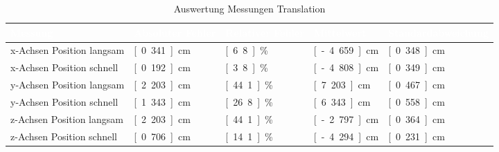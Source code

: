 \begin{table}[htbp]
     \centering
     \caption{Auswertung Messungen Translation}
     \label{tab:auswertung_tran}
     \begin{tabularx}{\textwidth}{|X|l|l|l|l|} 
		\hline
		\rowcolor{bfhblue}
		\textcolor{white}{Messung} & \textcolor{white}{Absoluter Fehler} & \textcolor{white}{Relativer Fehler} & \textcolor{white}{Mittelwert}  & \textcolor{white}{Standardabweichung}\\
		\hline
		x-Achsen Position langsam & \unit[0.341]{cm} & \unit[6.8]{\%} & \unit[-4.659]{cm} & \unit[0.348]{cm}\\
		\hline
		x-Achsen Position schnell & \unit[0.192]{cm} & \unit[3.8]{\%} & \unit[-4.808]{cm} & \unit[0.349]{cm} \\
		\hline
		y-Achsen Position langsam & \unit[2.203]{cm} & \unit[44.1]{\%} & \unit[7.203]{cm} & \unit[0.467]{cm}\\
		\hline
		y-Achsen Position schnell & \unit[1.343]{cm} & \unit[26.8]{\%} & \unit[6.343]{cm} & \unit[0.558]{cm} \\
		\hline
		z-Achsen Position langsam & \unit[2.203]{cm} & \unit[44.1]{\%} & \unit[-2.797]{cm} & \unit[0.364]{cm} \\
		\hline
		z-Achsen Position schnell & \unit[0.706]{cm} & \unit[14.1]{\%} & \unit[-4.294]{cm} & \unit[0.231]{cm}\\
		\hline
     \end{tabularx}  
\end{table}